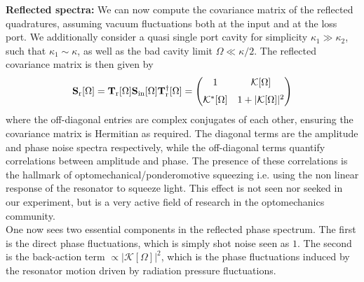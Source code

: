 \noindent \textbf{Reflected spectra:} We can now compute the covariance matrix of the reflected quadratures, assuming vacuum fluctuations both at the input and at the loss port. We additionally consider a quasi single port cavity for simplicity $\kappa_1 \gg \kappa_2$, such that $\kappa_1\sim\kappa$, as well as the bad cavity limit $\Omega \ll \kappa/2$. The reflected covariance matrix is then given by
\begin{equation}
      \mathbf{S}_{\rm r}[\Omega] =\mathbf{T}_{\mathrm{r}}[\Omega] \mathbf{S}_{\text{in}}[\Omega] \mathbf{T}_{\mathrm{r}}^{\dagger}[\Omega]  = \begin{pmatrix}
        1 &  \mathcal{K}[\Omega]\\[6pt]
          \mathcal{K}^{*}[\Omega]& 1 +  |\mathcal{K}[\Omega]|^2
      \end{pmatrix}
\end{equation}
where the off-diagonal entries are complex conjugates of each other, ensuring the covariance matrix is Hermitian as required. The diagonal terms are the amplitude and phase noise spectra respectively, while the off-diagonal terms quantify correlations between amplitude and phase. The presence of these correlations is the hallmark of optomechanical/ponderomotive squeezing i.e. using the non linear response of the resonator to squeeze light. This effect is not seen nor seeked in our experiment, but is a very active field of research in the optomechanics community. \\

One now sees two essential components in the reflected phase spectrum. The first is the direct phase fluctuations, which is simply shot noise seen as $1$. The second is the back-action term $\propto |\mathcal{K}[\Omega]|^2$, which is the phase fluctuations induced by the resonator motion driven by radiation pressure fluctuations. 

